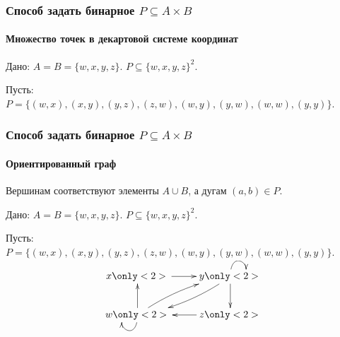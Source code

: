 \begin{frame}
    \frametitle{Способ задать бинарное $P\subseteq A\times B$}
    \framesubtitle{Множество точек в декартовой системе координат}
    
    \begin{example}
        Дано: $A=B=\{w,x,y,z\}$. $P\subseteq \{w,x,y,z\}^2$.
        
        Пусть: $P=\{(w,x),(x,y),(y,z),(z,w),(w,y),(y,w),(w,w),(y,y)\}$.
    \end{example}
    
    \begin{center}
    \end{center}
\end{frame}

\begin{frame}
    \frametitle{Способ задать бинарное $P\subseteq A\times B$}
    \framesubtitle{Ориентированный граф}
    
    Вершинам соответствуют элементы $A\cup B$, а дугам $(a,b)\in P$.
    
    \begin{example}
        Дано: $A=B=\{w,x,y,z\}$. $P\subseteq \{w,x,y,z\}^2$.
        
        Пусть: $P=\{(w,x),(x,y),(y,z),(z,w),(w,y),(y,w),(w,w),(y,y)\}$.
    \end{example}
    
    \[
        {\xymatrix{
            x \only<2>{ \ar@{->}[r] }
                &y \only<2>{ \ar@{->}@(u,r)[] \ar@{->}[d] \ar@{->}@/^/[dl] }
                    \\
            w \only<2>{ \ar@{->}@(d,l)[] \ar@{->}[u] \ar@{->}@/^/[ur] }
                &z \only<2>{ \ar@{->}[l] }
        }}
    \]
\end{frame}

